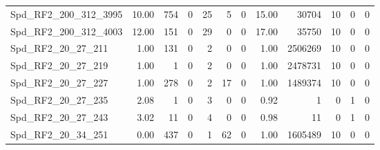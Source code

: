 \begin{longtable}[c]{@{}lrrrrrrrrrrr@{}}
Spd\_RF2\_200\_312\_3995     & 10.00                  & 754                     & 0                       & 25                     & 5                       & 0                       & 15.00                   & 30704                    & 10                       & 0                        & 0                        \\
Spd\_RF2\_200\_312\_4003     & 12.00                  & 151                     & 0                       & 29                     & 0                       & 0                       & 17.00                   & 35750                    & 10                       & 0                        & 0                        \\
Spd\_RF2\_20\_27\_211        & 1.00                   & 131                     & 0                       & 2                      & 0                       & 0                       & 1.00                    & 2506269                  & 10                       & 0                        & 0                        \\
Spd\_RF2\_20\_27\_219        & 1.00                   & 1                       & 0                       & 2                      & 0                       & 0                       & 1.00                    & 2478731                  & 10                       & 0                        & 0                        \\
Spd\_RF2\_20\_27\_227        & 1.00                   & 278                     & 0                       & 2                      & 17                      & 0                       & 1.00                    & 1489374                  & 10                       & 0                        & 0                        \\
Spd\_RF2\_20\_27\_235        & 2.08                   & 1                       & 0                       & 3                      & 0                       & 0                       & 0.92                    & 1                        & 0                        & 1                        & 0                        \\
Spd\_RF2\_20\_27\_243        & 3.02                   & 11                      & 0                       & 4                      & 0                       & 0                       & 0.98                    & 11                       & 0                        & 1                        & 0                        \\
Spd\_RF2\_20\_34\_251        & 0.00                   & 437                     & 0                       & 1                      & 62                      & 0                       & 1.00                    & 1605489                  & 10                       & 0                        & 0                        \\

\end{longtable}
